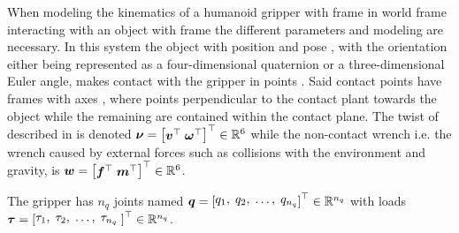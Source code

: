 When modeling the kinematics of a humanoid gripper with frame  in world frame  interacting with an object with frame  the different parameters and modeling are necessary. In this system the object with position  and pose , with the orientation either being represented as a four-dimensional quaternion or a three-dimensional Euler angle, makes contact with the gripper in points . Said contact points have frames  with axes , where  points perpendicular to the contact plant towards the object while the remaining are contained within the contact plane. The twist of  described in  is denoted $\vec{\nu} = \rvec{\vec{v}^\T\; \vec{\omega}^\T}^\T\inR{6} $ while the non-contact wrench i.e. the wrench caused by external forces such as collisions with the environment and gravity, is $\vec{w} = \rvec{\vec{f}^\T\; \vec{m}^\T}^\T\inR{6}$. \medskip

The gripper has $n_q$ joints named $\vec{q} = \rvec{q_1,\; q_2,\; \dots,\; q_{n_q}}^\T\in\R^{n_q}$ with loads $\vec{\tau} = \rvec{\tau_1,\;\tau_2,\;\dots,\;\tau_{n_q}\;}^\T\in\R^{n_q}$.







